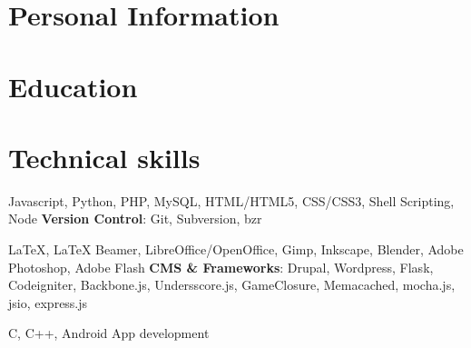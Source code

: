 \documentclass[11pt,a4paper]{moderncv}
\begin{document}
\maketitle


\section {Personal Information}

\section{Education}

\section{Technical skills}
           {Javascript, Python, PHP, MySQL, HTML/HTML5, CSS/CSS3, Shell Scripting, Node}
           {\textbf{Version Control}: }
           {Git, Subversion, bzr}

           {{\LaTeX}, {\LaTeX} Beamer, LibreOffice/OpenOffice, Gimp, Inkscape, Blender, Adobe Photoshop, Adobe Flash}
           {\textbf{CMS \& Frameworks}: }
           {Drupal, Wordpress, Flask, Codeigniter, Backbone.js, Undersscore.js, GameClosure, Memacached, mocha.js, jsio, express.js}

           {C, C++, Android App development}{}{}

\end{document}
